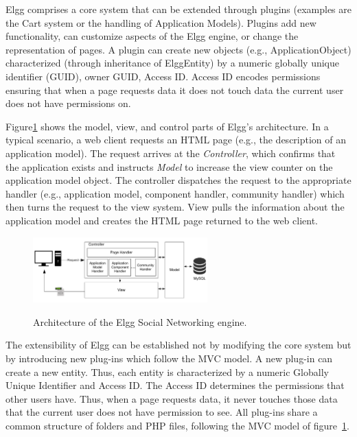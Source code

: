 Elgg comprises a core system that can be extended through plugins (examples are the Cart system or the handling of Application Models). Plugins add new functionality, can customize aspects of the Elgg engine, or change the representation of pages.
A plugin can create new objects (e.g., ApplicationObject) characterized (through inheritance of ElggEntity) by a numeric globally unique identifier (GUID), owner GUID, Access ID. Access ID encodes permissions ensuring that when a page requests data it does not touch data the current user does not have permissions on. 

Figure\ref{fig:elgg_architecture} shows the model, view, and control parts of Elgg's architecture. In a typical scenario, a web client requests an HTML page (e.g., the description of an application model).  The request arrives at the \emph{Controller}, which confirms that the application exists and instructs \emph{Model} to increase the view counter on the application model object. The controller dispatches the request to the appropriate handler (e.g., application model, component handler, community handler) which then turns the request to the view system. View pulls the information about the application model and creates the HTML page returned to the web client.


\begin{figure}[h]
	\caption{Architecture of the Elgg Social Networking engine.}
	\includegraphics[width=0.6\textwidth,natwidth=200,natheight=150]{./fig/elgg_architecture.pdf}
	\centering
	\label{fig:elgg_architecture}
\end{figure}


The extensibility of Elgg can be established not by modifying the core system but by introducing new plug-ins which follow the MVC model. A new plug-in can create a new entity. Thus, each entity is characterized by a numeric Globally Unique Identifier and Access ID. The Access ID determines the permissions that other users have. Thus, when a page requests data, it never touches those data that the current user does not have permission to see. All plug-ins share a common structure of folders and PHP files, following the MVC model of figure~\ref{fig:elgg_architecture}. 

